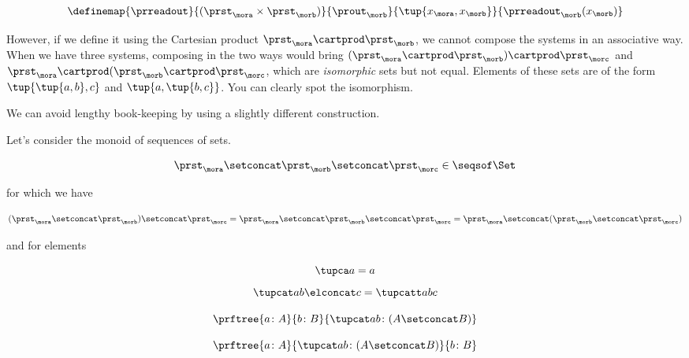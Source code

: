 \begin{equation}
  \definemap{
    \prreadout
    }{
      (\prst_{\mora} \times \prst_{\morb}) 
    }{
      \prout_{\morb}
    }{
      \tup{x_{\mora}, x_{\morb}}
    }{
      \prreadout_{\morb}(x_{\morb})
    }
\end{equation}

However, if we define it using the Cartesian product $\prst_{\mora} \cartprod \prst_{\morb}$, we cannot compose the systems in an associative way. When we have three systems, composing in the two ways would bring
$(\prst_{\mora} \cartprod \prst_{\morb}) \cartprod \prst_{\morc}$ and 
$\prst_{\mora} \cartprod (\prst_{\morb} \cartprod \prst_{\morc}$, which are \emph{isomorphic} sets but not equal.
Elements of these sets are of the form $\tup{\tup{a,b},c}$ and 
$\tup{a, \tup{b,c}}$. You can clearly spot the isomorphism. 

We can avoid lengthy book-keeping by using a slightly different construction. 

Let's consider the monoid of sequences of sets.

\begin{equation}
\prst_{\mora} \setconcat \prst_{\morb} \setconcat \prst_{\morc} \in \seqsof\Set
\end{equation}

for which we have 

\begin{equation}
  (\prst_{\mora} \setconcat \prst_{\morb} )\setconcat \prst_{\morc} =
  \prst_{\mora} \setconcat \prst_{\morb} \setconcat \prst_{\morc} =
  \prst_{\mora} \setconcat (\prst_{\morb} \setconcat \prst_{\morc})
\end{equation}
  
and for elements 

\begin{equation}
  \tupca a   = a
\end{equation}
\begin{equation}
   \tupcat a b \elconcat c = \tupcatt a b c
\end{equation}

\begin{equation}
  \prftree{a \colon A}{b \colon B}{ \tupcat a b \colon (A \setconcat B) }
\end{equation}
  
\begin{equation}
  \prftree{a \colon A}{ \tupcat a b \colon (A \setconcat B) }{  b \colon  B }
\end{equation}
  

